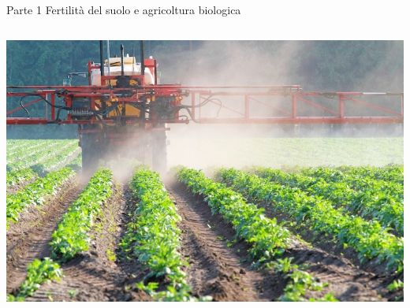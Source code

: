 \documentclass[xcolor={usenames, table, x11names}, final, 10pt]{beamer}
\begin{document}
\begin{frame}{Parte 1 \small{Fertilità del suolo e agricoltura biologica}}
\begin{columns}
{      \centering
      \includegraphics[width=\textwidth]{../foto/fitofarmaci.jpg}
    }
  \end{columns}
\end{frame}
\end{document}
